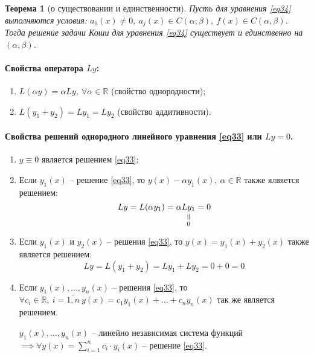 \documentclass[11pt,a4paper,oneside]{report}
\newcommand{\verteq}[0]{\rotatebox{90}{$=$}}
\newcommand{\equalto}[2]{\underset{\scriptstyle\overset{\mkern4mu\verteq}{#2}}{#1}}
\theoremstyle{definition}
\theoremstyle{plain}
\newtheorem{theorem}{Теорема}[section]
\theoremstyle{remark}
\begin{document}
\begin{theorem}[о существовании и единственности]
    Пусть для уравнения \ref{eq34} выполняются условия: $a_0(x) \ne 0, \ a_j(x) \in C(\alpha;\beta), \ f(x) \in C(\alpha, \beta)$. Тогда решение задачи Коши для уравнения \ref{eq34} существует и единственно на $(\alpha, \beta)$.
\end{theorem}

\paragraph*{Свойства оператора $Ly$:}

\begin{enumerate}
    \item $L(\alpha y) = \alpha Ly, \ \forall \alpha \in \mathbb{R}$ (свойство однородности);
    \item $L(y_1 + y_2) = Ly_1 = Ly_2$ (свойство аддитивности).
\end{enumerate}

\paragraph*{Свойства решений однородного линейного уравнения \ref{eq33} или $Ly = 0$.}

\begin{enumerate}
    \item $y \equiv 0$ является решением \ref{eq33};
    \item Если $y_1(x)$ -- решение \ref{eq33}, то $y(x) - \alpha y_1(x), \ \alpha \in \mathbb{R}$ также ялвяется решением:
          \begin{equation*}
              Ly = L(\alpha y_1) = \alpha \equalto{Ly_1}{0} = 0
          \end{equation*}
    \item Если $y_1(x)$ и $y_2(x)$ -- решения \ref{eq33}, то $y(x) = y_1(x) + y_2(x)$ также является решением:
          \begin{equation*}
              Ly = L(y_1 + y_2) = Ly_1 + Ly_2 = 0 + 0 = 0
          \end{equation*}
    \item Если $y_1(x), \ldots, y_n(x)$ -- решения \ref{eq33}, то $\forall c_i \in \mathbb{R}, \ i =\overline{1,n} \ y(x) = c_1 y_1(x) + \ldots + c_n y_n(x)$ так же является решением.

          $y_1(x), \ldots, y_n(x)$ -- линейно независимая система функций $\implies \forall y(x) = \sum_{i = 1}^{n} c_i \cdot y_i(x)$ -- решение \ref{eq33}.
\end{enumerate}
\end{document}
